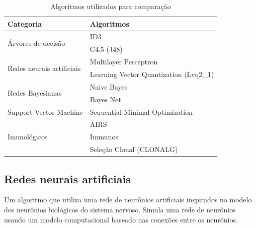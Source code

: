\begin{table}[h]
    \vspace{0.5cm}
    \centering
    \caption{Algoritmos utilizados para comparação}
    \label{tbl:dev_algs}
    \vspace{0.5cm}
    \begin{tabular}{|l|l|}
        \hline
        \textbf{Categoria}                         & \textbf{Algoritmos}                    \\
        \hline
        \multirow{2}{*}{Árvores de decisão}        & ID3                                    \\ \cline{2-2}
                                                   & C4.5 (J48)                             \\
        \hline
        \multirow{2}{*}{Redes neurais artificiais} & Multilayer Perceptron                  \\ \cline{2-2}
                                                   & Learning Vector Quantization (Lvq2\_1) \\
        \hline
        \multirow{2}{*}{Redes Bayesianas}          & Naive Bayes                            \\ \cline{2-2}
                                                   & Bayes Net                              \\
        \hline
        Support Vector Machine                     & Sequential Minimal Optimization        \\
        \hline
        \multirow{3}{*}{Imunológicos}              & AIRS                                   \\ \cline{2-2}
                                                   & Immunos                                \\ \cline{2-2}
                                                   & Seleção Clonal (CLONALG)               \\
        \hline
    \end{tabular}
    \vspace{0.5cm}
\end{table}

\subsection{Redes neurais artificiais}

Um algoritmo que utiliza uma rede de neurônios artificiais inspirados no modelo dos neurônios biológicos do sistema nervoso. Simula uma rede de neurônios usando um modelo computacional baseado nas conexões entre os neurônios.

